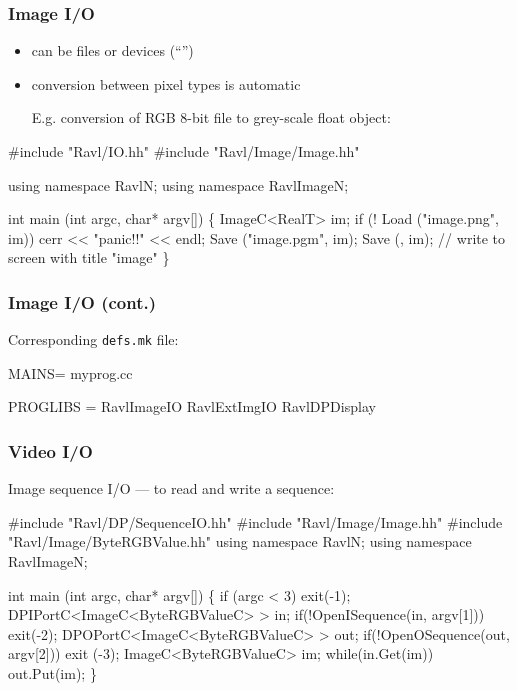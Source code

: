 \documentclass[landscape]{beamer}
\begin{document}
\begin{frame}[fragile]\frametitle{Image I/O}


\begin{itemize}
\item  can be files or devices
  (``'')

\pause\item conversion between pixel types is automatic

 E.g. conversion of RGB 8-bit file to grey-scale float object:
\end{itemize}


\begin{Code}[commandchars=\\\{\}]
  #include "Ravl/IO.hh"
  #include "Ravl/Image/Image.hh"
  
  using namespace RavlN;
  using namespace RavlImageN;
  
  int main (int argc, char* argv[]) \{  
    ImageC<RealT> im;
    if (! Load ("image.png", im))    cerr << "panic!!" << endl;
    Save ("image.pgm", im);
    Save (, im); // write to screen with title "image"
  \} 
\end{Code}
  
\end{frame}


\begin{frame}[fragile]\frametitle{Image I/O (cont.)}

Corresponding {\tt defs.mk} file:\\[2em]

\begin{Code}
  MAINS= myprog.cc
  
  PROGLIBS = RavlImageIO RavlExtImgIO RavlDPDisplay
\end{Code}

\end{frame}

\begin{frame}[fragile]\frametitle{Video I/O}

Image sequence I/O --- to read and write a sequence:\\

\begin{Code}[commandchars=\\\{\}]
  #include "Ravl/DP/SequenceIO.hh"
  #include "Ravl/Image/Image.hh"
  #include "Ravl/Image/ByteRGBValue.hh"
  using namespace RavlN;
  using namespace RavlImageN;
  
  int main (int argc, char* argv[]) \{
    if (argc < 3)  exit(-1);
    DPIPortC<ImageC<ByteRGBValueC> > in;
    if(!OpenISequence(in, argv[1]))  exit(-2);
    DPOPortC<ImageC<ByteRGBValueC> > out;
    if(!OpenOSequence(out, argv[2])) exit (-3);
    ImageC<ByteRGBValueC> im;
    while(in.Get(im))
      out.Put(im);
  \}
\end{Code}
\end{frame}
\end{document}
